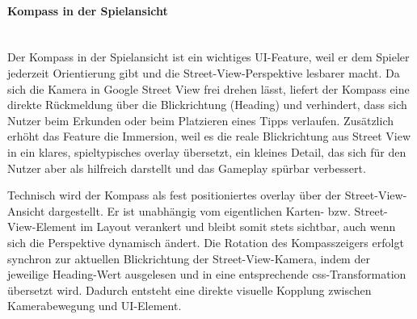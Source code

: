 \paragraph{Kompass in der Spielansicht}
\mbox{}\\
Der Kompass in der Spielansicht ist ein wichtiges UI-Feature, weil er dem Spieler jederzeit Orientierung gibt und die Street-View-Perspektive lesbarer macht. Da sich die Kamera in Google Street View frei drehen lässt, liefert der Kompass eine direkte Rückmeldung über die Blickrichtung (Heading) und verhindert, dass sich Nutzer beim Erkunden oder beim Platzieren eines Tipps verlaufen. Zusätzlich erhöht das Feature die Immersion, weil es die reale Blickrichtung aus Street View in ein klares, spieltypisches \gls{overlay} übersetzt, ein kleines Detail, das sich für den Nutzer aber als hilfreich darstellt und das Gameplay spürbar verbessert.

Technisch wird der Kompass als fest positioniertes \gls{overlay} über der Street-View-Ansicht dargestellt. Er ist unabhängig vom eigentlichen Karten- bzw. Street-View-Element im Layout verankert und bleibt somit stets sichtbar, auch wenn sich die Perspektive dynamisch ändert. Die Rotation des Kompasszeigers erfolgt synchron zur aktuellen Blickrichtung der Street-View-Kamera, indem der jeweilige Heading-Wert ausgelesen und in eine entsprechende \gls{css}-Transformation übersetzt wird. Dadurch entsteht eine direkte visuelle Kopplung zwischen Kamerabewegung und UI-Element.

